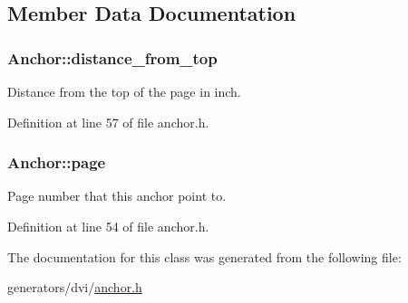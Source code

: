 \subsection{Member Data Documentation}
\hypertarget{classAnchor_a7bf0367a6cb313c7e2f7c7527928b635}{
\subsubsection[{distance\+\_\+from\+\_\+top}]{ Anchor\+::distance\+\_\+from\+\_\+top}}\label{classAnchor_a7bf0367a6cb313c7e2f7c7527928b635}


Distance from the top of the page in inch. 



Definition at line 57 of file anchor.\+h.

\hypertarget{classAnchor_a6383150d7bcb2a7f0281274d17881aa2}{
\subsubsection[{page}]{ Anchor\+::page}}\label{classAnchor_a6383150d7bcb2a7f0281274d17881aa2}


Page number that this anchor point to. 



Definition at line 54 of file anchor.\+h.



The documentation for this class was generated from the following file\+:\begin{DoxyCompactItemize}
\item 
generators/dvi/\hyperlink{anchor_8h}{anchor.\+h}\end{DoxyCompactItemize}
